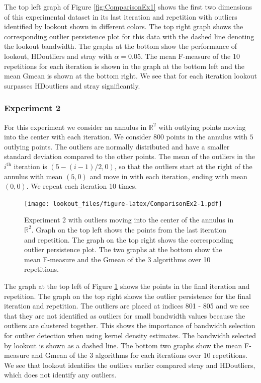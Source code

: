 \documentclass[11pt,a4paper,]{article}
\theoremstyle{definition}
\theoremstyle{definition}
\theoremstyle{definition}
\theoremstyle{remark}
\begin{document}
The top left graph of Figure \ref{fig:ComparisonEx1} shows the first two dimensions of this experimental dataset in its last iteration and repetition with outliers identified by lookout shown in different colors. The top right graph shows the corresponding outlier persistence plot for this data with the dashed line denoting the lookout bandwidth. The graphs at the bottom show the performance of lookout, HDoutliers and stray with \(\alpha = 0.05\). The mean F-measure of the 10 repetitions for each iteration is shown in the graph at the bottom left and the mean Gmean is shown at the bottom right. We see that for each iteration lookout surpasses HDoutliers and stray significantly.

\hypertarget{experiment-2}{%
\subsubsection*{Experiment 2}\label{experiment-2}}

For this experiment we consider an annulus in \(\mathbb{R}^2\) with outlying points moving into the center with each iteration. We consider \(800\) points in the annulus with \(5\) outlying points. The outliers are normally distributed and have a smaller standard deviation compared to the other points. The mean of the outliers in the \(i^{\text{th}}\) iteration is \(\left( 5 - (i-1) /2, 0 \right)\), so that the outliers start at the right of the annulus with mean \((5,0)\) and move in with each iteration, ending with mean \((0,0)\). We repeat each iteration 10 times.

\begin{figure}
\centering
\texttt{[image: lookout\_files/figure-latex/ComparisonEx2-1.pdf]}
\caption{\label{fig:ComparisonEx2}Experiment 2 with outliers moving into the center of the annulus in \(\mathbb{R}^2\). Graph on the top left shows the points from the last iteration and repetition. The graph on the top right shows the corresponding outlier persistence plot. The two graphs at the bottom show the mean F-measure and the Gmean of the 3 algorithms over 10 repetitions.}
\end{figure}

The graph at the top left of Figure \ref{fig:ComparisonEx2} shows the points in the final iteration and repetition. The graph on the top right shows the outlier persistence for the final iteration and repetition. The outliers are placed at indices 801 - 805 and we see that they are not identified as outliers for small bandwidth values because the outliers are clustered together. This shows the importance of bandwidth selection for outlier detection when using kernel density estimates. The bandwidth selected by lookout is shown as a dashed line. The bottom two graphs show the mean F-measure and Gmean of the 3 algorithms for each iterations over 10 repetitions. We see that lookout identifies the outliers earlier compared stray and HDoutliers, which does not identify any outliers.
\end{document}
